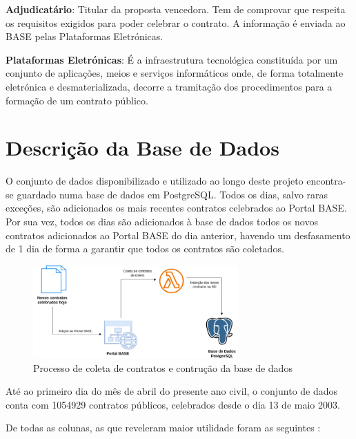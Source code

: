 \begin{my_enumerate}
	\item \textbf{Adjudicatário}: Titular da proposta vencedora. Tem de comprovar que respeita os requisitos exigidos para poder celebrar o contrato. A informação é enviada ao BASE pelas Plataformas Eletrónicas.
	
	\item \textbf{Plataformas Eletrónicas}: É a infraestrutura tecnológica constituída por um conjunto de aplicações, meios e serviços informáticos onde, de forma totalmente eletrónica e desmaterializada, decorre a tramitação dos procedimentos para a formação de um contrato público. 
\end{my_enumerate}







\section{Descrição da Base de Dados}



O conjunto de dados disponibilizado e utilizado ao longo deste projeto encontra-se guardado numa base de dados em PostgreSQL. Todos os dias, salvo raras exceções, são adicionados os mais recentes contratos celebrados ao Portal BASE. Por sua vez, todos os dias são adicionados à base de dados todos os novos contratos adicionados ao Portal BASE do dia anterior, havendo um desfasamento de 1 dia de forma a garantir que todos os contratos são coletados. 


\begin{figure}[H]
	\centering
	\includegraphics[width=0.7\textwidth]{imagens/portal_coleta.png}
	\caption{Processo de coleta de contratos e contrução da base de dados}
	\label{fig:processocoleta}
\end{figure}


Até ao primeiro dia do mês de abril do presente ano civil, o conjunto de dados conta com 1054929 contratos públicos, celebrados desde o dia 13 de maio 2003. 

De todas as colunas, as que reveleram maior utilidade foram as seguintes : 


